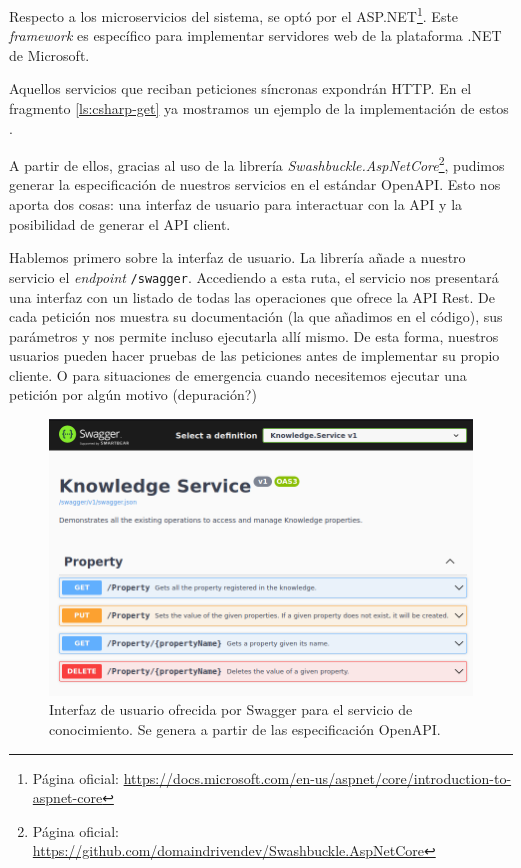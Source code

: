 Respecto a los microservicios del sistema, se optó por el  ASP.NET\footnote{Página oficial: \url{https://docs.microsoft.com/en-us/aspnet/core/introduction-to-aspnet-core}}. Este \emph{framework} es específico para implementar servidores web de la plataforma .NET de Microsoft.

Aquellos servicios que reciban peticiones síncronas expondrán  HTTP. En el fragmento \ref{ls:csharp-get} ya mostramos un ejemplo de la implementación de estos .

A partir de ellos, gracias al uso de la librería \emph{Swashbuckle.AspNetCore}\footnote{Página oficial: \url{https://github.com/domaindrivendev/Swashbuckle.AspNetCore}}, pudimos generar la especificación de nuestros servicios en el estándar OpenAPI. Esto nos aporta dos cosas: una interfaz de usuario para interactuar con la API y la posibilidad de generar el API client.

Hablemos primero sobre la interfaz de usuario. La librería añade a nuestro servicio el \emph{endpoint} \texttt{/swagger}. Accediendo a esta ruta, el servicio nos presentará una interfaz con un listado de todas las operaciones que ofrece la API Rest. De cada petición nos muestra su documentación (la que añadimos en el código), sus parámetros y nos permite incluso ejecutarla allí mismo. De esta forma, nuestros usuarios pueden hacer pruebas de las peticiones antes de implementar su propio cliente. O para situaciones de emergencia cuando necesitemos ejecutar una petición por algún motivo (depuración?)

\begin{figure}[htb]
  \centering
  \includegraphics[scale=1.5]{cap_implementacion/images/swagger-knowledge-ui}
  \caption{Interfaz de usuario ofrecida por Swagger para el servicio de conocimiento. Se genera a partir de las especificación OpenAPI.}
  \label{fig:swagger-knowledge-ui}
\end{figure}

